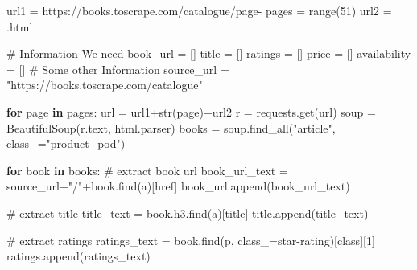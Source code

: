 \documentclass[
  letterpaper,
  DIV=11,
  numbers=noendperiod]{scrreprt}
\newenvironment{Shaded}{\begin{snugshade}}{\end{snugshade}}
\newcommand{\BuiltInTok}[1]{\textcolor[rgb]{0.00,0.23,0.31}{#1}}
\newcommand{\CommentTok}[1]{\textcolor[rgb]{0.37,0.37,0.37}{#1}}
\newcommand{\ControlFlowTok}[1]{\textcolor[rgb]{0.00,0.23,0.31}{\textbf{#1}}}
\newcommand{\DecValTok}[1]{\textcolor[rgb]{0.68,0.00,0.00}{#1}}
\newcommand{\KeywordTok}[1]{\textcolor[rgb]{0.00,0.23,0.31}{\textbf{#1}}}
\newcommand{\NormalTok}[1]{\textcolor[rgb]{0.00,0.23,0.31}{#1}}
\newcommand{\OperatorTok}[1]{\textcolor[rgb]{0.37,0.37,0.37}{#1}}
\newcommand{\StringTok}[1]{\textcolor[rgb]{0.13,0.47,0.30}{#1}}
\begin{document}
\begin{Shaded}
\begin{Highlighting}[]
\NormalTok{url1 }\OperatorTok{=} \StringTok{\textquotesingle{}https://books.toscrape.com/catalogue/page{-}\textquotesingle{}}
\NormalTok{pages }\OperatorTok{=} \BuiltInTok{range}\NormalTok{(}\DecValTok{51}\NormalTok{)}
\NormalTok{url2 }\OperatorTok{=} \StringTok{\textquotesingle{}.html\textquotesingle{}}

\CommentTok{\# Information We need }
\NormalTok{book\_url }\OperatorTok{=}\NormalTok{ []}
\NormalTok{title }\OperatorTok{=}\NormalTok{ []}
\NormalTok{ratings }\OperatorTok{=}\NormalTok{ []}
\NormalTok{price }\OperatorTok{=}\NormalTok{ []}
\NormalTok{availability }\OperatorTok{=}\NormalTok{ []}
\CommentTok{\# Some other Information }
\NormalTok{source\_url }\OperatorTok{=} \StringTok{"https://books.toscrape.com/catalogue"}

\ControlFlowTok{for}\NormalTok{ page }\KeywordTok{in}\NormalTok{ pages:}
\NormalTok{    url }\OperatorTok{=}\NormalTok{ url1}\OperatorTok{+}\BuiltInTok{str}\NormalTok{(page)}\OperatorTok{+}\NormalTok{url2}
\NormalTok{    r }\OperatorTok{=}\NormalTok{ requests.get(url)}
\NormalTok{    soup }\OperatorTok{=}\NormalTok{ BeautifulSoup(r.text, }\StringTok{\textquotesingle{}html.parser\textquotesingle{}}\NormalTok{)}
\NormalTok{    books }\OperatorTok{=}\NormalTok{ soup.find\_all(}\StringTok{"article"}\NormalTok{, class\_}\OperatorTok{=}\StringTok{"product\_pod"}\NormalTok{)}

    \ControlFlowTok{for}\NormalTok{ book }\KeywordTok{in}\NormalTok{ books:}
        \CommentTok{\# extract book url }
\NormalTok{        book\_url\_text }\OperatorTok{=}\NormalTok{ source\_url}\OperatorTok{+}\StringTok{"/"}\OperatorTok{+}\NormalTok{book.find(}\StringTok{\textquotesingle{}a\textquotesingle{}}\NormalTok{)[}\StringTok{\textquotesingle{}href\textquotesingle{}}\NormalTok{]}
\NormalTok{        book\_url.append(book\_url\_text)}

        \CommentTok{\# extract title }
\NormalTok{        title\_text }\OperatorTok{=}\NormalTok{ book.h3.find(}\StringTok{\textquotesingle{}a\textquotesingle{}}\NormalTok{)[}\StringTok{\textquotesingle{}title\textquotesingle{}}\NormalTok{]}
\NormalTok{        title.append(title\_text)}

        \CommentTok{\# extract ratings }
\NormalTok{        ratings\_text }\OperatorTok{=}\NormalTok{ book.find(}\StringTok{\textquotesingle{}p\textquotesingle{}}\NormalTok{, class\_}\OperatorTok{=}\StringTok{\textquotesingle{}star{-}rating\textquotesingle{}}\NormalTok{)[}\StringTok{\textquotesingle{}class\textquotesingle{}}\NormalTok{][}\DecValTok{1}\NormalTok{]}
\NormalTok{        ratings.append(ratings\_text)}


\end{Highlighting}
\end{Shaded}
\end{document}
